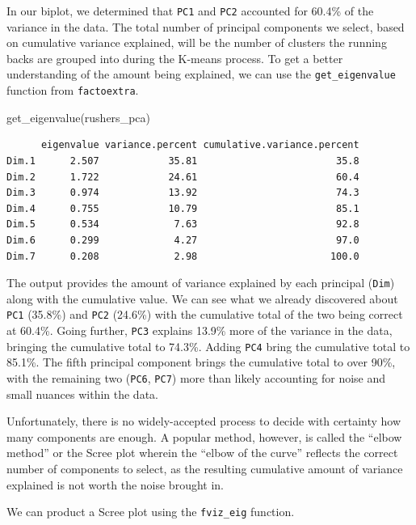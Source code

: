 \documentclass[
  letterpaper,
]{krantz}
\newenvironment{Shaded}{\begin{snugshade}}{\end{snugshade}}
\newcommand{\FunctionTok}[1]{\textcolor[rgb]{0.28,0.35,0.67}{#1}}
\newcommand{\NormalTok}[1]{\textcolor[rgb]{0.00,0.23,0.31}{#1}}
\begin{document}
In our biplot, we determined that \texttt{PC1} and \texttt{PC2}
accounted for 60.4\% of the variance in the data. The total number of
principal components we select, based on cumulative variance explained,
will be the number of clusters the running backs are grouped into during
the K-means process. To get a better understanding of the amount being
explained, we can use the \texttt{get\_eigenvalue} function from
\texttt{factoextra}.

\begin{Shaded}
\begin{Highlighting}[]
\FunctionTok{get\_eigenvalue}\NormalTok{(rushers\_pca)}
\end{Highlighting}
\end{Shaded}

\begin{verbatim}
      eigenvalue variance.percent cumulative.variance.percent
Dim.1      2.507            35.81                        35.8
Dim.2      1.722            24.61                        60.4
Dim.3      0.974            13.92                        74.3
Dim.4      0.755            10.79                        85.1
Dim.5      0.534             7.63                        92.8
Dim.6      0.299             4.27                        97.0
Dim.7      0.208             2.98                       100.0
\end{verbatim}

The output provides the amount of variance explained by each principal
(\texttt{Dim}) along with the cumulative value. We can see what we
already discovered about \texttt{PC1} (35.8\%) and \texttt{PC2} (24.6\%)
with the cumulative total of the two being correct at 60.4\%. Going
further, \texttt{PC3} explains 13.9\% more of the variance in the data,
bringing the cumulative total to 74.3\%. Adding \texttt{PC4} bring the
cumulative total to 85.1\%. The fifth principal component brings the
cumulative total to over 90\%, with the remaining two (\texttt{PC6},
\texttt{PC7}) more than likely accounting for noise and small nuances
within the data.

Unfortunately, there is no widely-accepted process to decide with
certainty how many components are enough. A popular method, however, is
called the ``elbow method'' or the Scree plot wherein the ``elbow of the
curve'' reflects the correct number of components to select, as the
resulting cumulative amount of variance explained is not worth the noise
brought in.

We can product a Scree plot using the \texttt{fviz\_eig} function.
\end{document}

